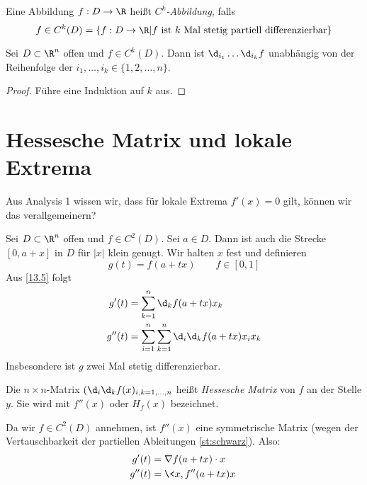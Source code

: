 \documentclass{mycourse}
\begin{document}
\begin{df}
	Eine Abbildung $f:D\to \R$ heißt \emph{$C^k$-Abbildung}, falls
	\[
		f \in C^k(D) = \{f:D\to \R|f \text{ ist $k$ Mal stetig partiell differenzierbar}\}
	\]
\end{df}

\begin{thm}
\label{st:schwarz}
Sei $D\subset \R^n$ offen und $f\in C^k(D)$. 
Dann ist $\d_{i_1}\dotsc\d_{i_k}f$ unabhängig von der Reihenfolge der $i_1,\dotsc,i_k\in\{1,2,\dotsc,n\}$.

\begin{proof}
Führe eine Induktion auf $k$ aus.
\end{proof}
\end{thm}

\setcounter{section}{13}
\setcounter{subsection}{5}
\section{Hessesche Matrix und lokale Extrema}

Aus Analysis 1 wissen wir, dass für lokale Extrema $f'(x)=0$ gilt, können wir das verallgemeinern?

Sei $D\subset \R^n$ offen und $f\in C^2(D)$. 
Sei $a\in D$.
Dann ist auch die Strecke $[0,a+x]$ in $D$ für $|x|$ klein genugt.
Wir halten $x$ fest und definieren
\[
g(t) = f(a+tx) \qquad f\in [0,1]
\]
Aus \ref{13.5} folgt
\begin{align*}
g'(t) &= \sum_{k=1}^n\d_kf(a+tx)x_k\\
g''(t) &= \sum_{i=1}^n\sum_{k=1}^n\d_i\d_kf(a+tx)x_ix_k
\end{align*}
Insbesondere ist $g$ zwei Mal stetig differenzierbar.

Die  $n\times n$-Matrix $(\d_i\d_kf(x)_{i,k=1,\dotsc,n}$ heißt \emph{Hessesche Matrix} von $f$ an der Stelle $y$.
Sie wird mit $f''(x)$ oder $H_f(x)$ bezeichnet.

Da wir $f\in C^2(D)$ annehmen, ist $f''(x)$ eine symmetrische Matrix (wegen der Vertauschbarkeit der partiellen Ableitungen \ref{st:schwarz}).
Also:
\begin{align*}
g'(t) &= \nabla f(a+tx)\cdot x\\
g''(t) &= \<x,f''(a+tx)x\>
\end{align*}
\end{document}
